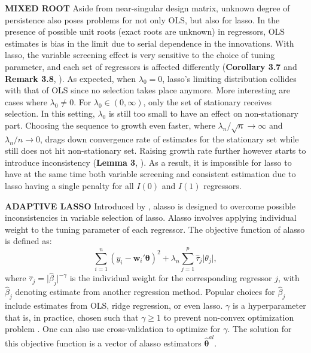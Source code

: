 \documentclass[12pt,a4paper]{article}
\DeclareMathOperator*{\argmin}{arg\,min} %
\begin{document}
\textbf{MIXED ROOT} Aside from near-singular design matrix, unknown degree of persistence also poses problems for not only OLS, but also for lasso. In the presence of possible unit roots (exact roots are unknown) in regressors, OLS estimates is bias in the limit due to serial dependence in the innovations. With lasso, the variable screening effect is very sensitive to the choice of tuning parameter, and each set of regressors is affected differently (\textbf{Corollary 3.7} and \textbf{Remark 3.8}, \cite{lee2018lasso}). As expected, when $ \lambda_0 = 0 $, lasso's limiting distribution collides with that of OLS since no selection takes place anymore. More interesting are cases where $ \lambda_0 \neq 0 $. For $ \lambda_0 \in (0, \infty) $, only the set of stationary receives selection. In this setting, $ \lambda_0 $ is still too small to have an effect on non-stationary part. Choosing the sequence to growth even faster, where  $ \lambda_n/\sqrt{n} \rightarrow \infty $ and $ \lambda_n/n \rightarrow 0 $, drags down convergence rate of estimates for the stationary set while still does not hit non-stationary set. Raising growth rate further however starts to introduce inconsistency (\textbf{Lemma 3}, \cite{zou2006adaptive}). As a result, it is impossible for lasso to have at the same time both variable screening and consistent estimation due to lasso having a single penalty for all $ I(0) $ and $ I(1) $ regressors.

\textbf{ADAPTIVE LASSO} Introduced by \cite{zou2006adaptive}, alasso is designed to overcome possible inconsistencies in variable selection of lasso. Alasso involves applying individual weight to the tuning parameter of each regressor. The objective function of alasso is defined as:
\begin{equation}\label{eq:7}
	\sum_{i = 1}^n(y_i - \bm{w}_i'\bm{\theta})^2 + 
	\lambda_n\sum_{j = 1}^p \hat{\tau}_j \vert\theta_j\vert,
\end{equation}
where $ \hat{\tau}_j = \vert\hat{\beta}_j\vert^{-\gamma} $ is the individual weight for the corresponding regressor $ j $, with $ \hat{\beta}_j $ denoting estimate from another regression method. Popular choices for $ \hat{\beta}_j $ include estimates from OLS, ridge regression, or even lasso. $ \gamma $ is a hyperparameter that is, in practice, chosen such that $ \gamma \geq 1 $ to prevent non-convex optimization problem \citep{lee2018lasso}. One can also use cross-validation to optimize for $ \gamma $. The solution for this objective function is a vector of alasso estimators $ \hat{\bm{\theta}}^{al} $.
\end{document}
